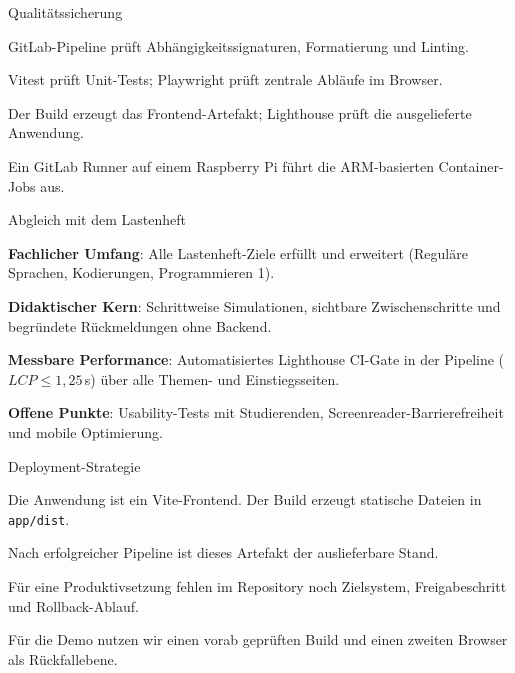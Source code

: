 
\begin{itemframe}{Qualitätssicherung}
  \item GitLab-Pipeline prüft Abhängigkeitssignaturen, Formatierung und Linting.
  \item Vitest prüft Unit-Tests; Playwright prüft zentrale Abläufe im Browser.
  \item Der Build erzeugt das Frontend-Artefakt; Lighthouse prüft die ausgelieferte Anwendung.
  \item Ein GitLab Runner auf einem Raspberry Pi führt die ARM-basierten Container-Jobs aus.
\end{itemframe}

\begin{itemframe}{Abgleich mit dem Lastenheft}
  \item \textbf{Fachlicher Umfang}: Alle Lastenheft-Ziele erfüllt und erweitert (Reguläre Sprachen, Kodierungen, Programmieren 1).
  \item \textbf{Didaktischer Kern}: Schrittweise Simulationen, sichtbare Zwischenschritte und begründete Rückmeldungen ohne Backend.
  \item \textbf{Messbare Performance}: Automatisiertes Lighthouse CI-Gate in der Pipeline ($LCP \le 1{,}25$\,s) über alle Themen- und Einstiegsseiten.
  \item \textbf{Offene Punkte}: Usability-Tests mit Studierenden, Screenreader-Barrierefreiheit und mobile Optimierung.
\end{itemframe}

\begin{itemframe}{Deployment-Strategie}
  \item Die Anwendung ist ein Vite-Frontend. Der Build erzeugt statische Dateien in \texttt{app/dist}.
  \item Nach erfolgreicher Pipeline ist dieses Artefakt der auslieferbare Stand.
  \item Für eine Produktivsetzung fehlen im Repository noch Zielsystem, Freigabeschritt und Rollback-Ablauf.
  \item Für die Demo nutzen wir einen vorab geprüften Build und einen zweiten Browser als Rückfallebene.
\end{itemframe}
